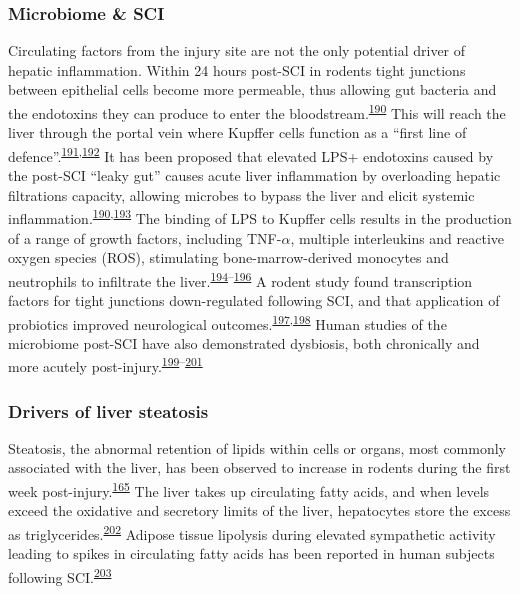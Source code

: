 \documentclass[
]{article}
\begin{document}
\hypertarget{microbiome-sci}{%
\subsubsection{Microbiome \& SCI}\label{microbiome-sci}}

Circulating factors from the injury site are not the only potential driver of hepatic inflammation.
Within 24 hours post-SCI in rodents tight junctions between epithelial cells become more permeable, thus allowing gut bacteria and the endotoxins they can produce to enter the bloodstream.\textsuperscript{\protect\hyperlink{ref-liu_study_2004}{190}}
This will reach the liver through the portal vein where Kupffer cells function as a ``first line of defence''.\textsuperscript{\protect\hyperlink{ref-jenne_immune_2013}{191},\protect\hyperlink{ref-balmer_liver_2014}{192}}
It has been proposed that elevated LPS+ endotoxins caused by the post-SCI ``leaky gut'' causes acute liver inflammation by overloading hepatic filtrations capacity, allowing microbes to bypass the liver and elicit systemic inflammation.\textsuperscript{\protect\hyperlink{ref-liu_study_2004}{190},\protect\hyperlink{ref-oconnor_investigation_2018}{193}}
The binding of LPS to Kupffer cells results in the production of a range of growth factors, including TNF-\(\alpha\), multiple interleukins and reactive oxygen species (ROS), stimulating bone-marrow-derived monocytes and neutrophils to infiltrate the liver.\textsuperscript{\protect\hyperlink{ref-myers_following_2019}{194}--\protect\hyperlink{ref-kazankov_role_2019}{196}}
A rodent study found transcription factors for tight junctions down-regulated following SCI, and that application of probiotics improved neurological outcomes.\textsuperscript{\protect\hyperlink{ref-kigerl_gut_2018}{197},\protect\hyperlink{ref-kigerl_gut_2016}{198}}
Human studies of the microbiome post-SCI have also demonstrated dysbiosis, both chronically and more acutely post-injury.\textsuperscript{\protect\hyperlink{ref-zhang_gut_2018}{199}--\protect\hyperlink{ref-bazzocchi_changes_2021}{201}}

\hypertarget{drivers-of-liver-steatosis}{%
\subsubsection{Drivers of liver steatosis}\label{drivers-of-liver-steatosis}}

Steatosis, the abnormal retention of lipids within cells or organs, most commonly associated with the liver, has been observed to increase in rodents during the first week post-injury.\textsuperscript{\protect\hyperlink{ref-sauerbeck_spinal_2015}{165}}
The liver takes up circulating fatty acids, and when levels exceed the oxidative and secretory limits of the liver, hepatocytes store the excess as triglycerides.\textsuperscript{\protect\hyperlink{ref-diraison_role_1998}{202}}
Adipose tissue lipolysis during elevated sympathetic activity leading to spikes in circulating fatty acids has been reported in human subjects following SCI.\textsuperscript{\protect\hyperlink{ref-karlsson_insulin_1999}{203}}
\end{document}
